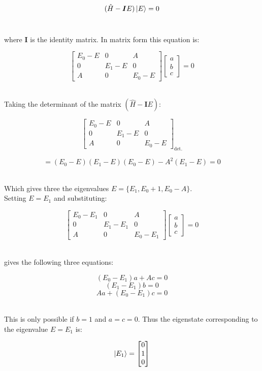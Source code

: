 \documentclass[14pt]{extarticle}
\renewcommand{\v}[1]{{\bm #1}}
\begin{document}
$$(\hat H - \v I E ) \ket E = 0$$ \ 

where $\v I$ is the identity matrix. In matrix form this equation is: 

$$
\begin{bmatrix}
	E_0 - E & 0 & A \\ 
	0 & E_1 - E & 0 \\ 
	A & 0 & E_0 - E
\end{bmatrix}
\begin{bmatrix} a \\ b \\ c 
\end{bmatrix} = 0
$$ \ 

Taking the determinant of the matrix $(\hat H - \v I E)$: 

$$
\begin{bmatrix}
        E_0 - E & 0 & A \\ 
        0 & E_1 - E & 0 \\ 
        A & 0 & E_0 - E
\end{bmatrix}_{\text{det.}}
$$ 

$$= (E_0 - E)(E_1 - E)(E_0 - E) - A^2 (E_1 - E) = 0$$ \ 

Which gives three the eigenvalues $E = \{ E_1, E_0+1, E_0-A \}$. \\ 

Setting $E = E_1$ and substituting:

$$
\begin{bmatrix}
        E_0 - E_1 & 0 & A \\ 
        0 & E_1 - E_1 & 0 \\ 
        A & 0 & E_0 - E_1
\end{bmatrix}
\begin{bmatrix}
	a \\ b \\ c
\end{bmatrix}
=0
$$ \ 

gives the following three equations: 

$$(E_0 - E_1)a + Ac = 0$$
$$(E_1 - E_1)b = 0$$
$$Aa + (E_0-E_1)c = 0$$ \ 

This is only possible if $b = 1$ and $a = c = 0$. Thus the eigenstate corresponding to the eigenvalue $E = E_1$ is:

$$\ket{E_1} = \begin{bmatrix}
        0 \\ 1 \\ 0
\end{bmatrix}
$$ \ 
\end{document}
